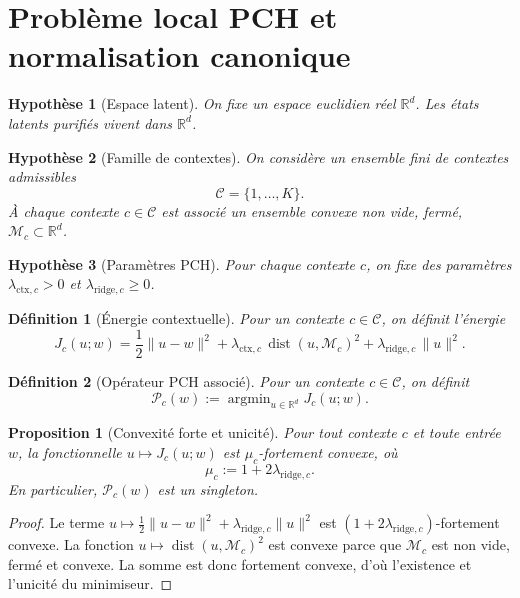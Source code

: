 \documentclass[11pt,a4paper]{article}
\newtheorem{definition}{Définition}[section]
\newtheorem{assumption}{Hypothèse}[section]
\newtheorem{proposition}{Proposition}[section]
\DeclareMathOperator{\argmin}{argmin}
\DeclareMathOperator{\dist}{dist}
\newcommand{\R}{\mathbb R}
\newcommand{\Mcal}{\mathcal M}
\newcommand{\Ccal}{\mathcal C}
\newcommand{\Pcal}{\mathcal P}
\begin{document}
\section{Problème local PCH et normalisation canonique}

\begin{assumption}[Espace latent]
On fixe un espace euclidien réel \(\R^d\). Les états latents purifiés vivent dans \(\R^d\).
\end{assumption}

\begin{assumption}[Famille de contextes]
On considère un ensemble fini de contextes admissibles
\[
\Ccal=\{1,\dots,K\}.
\]
À chaque contexte \(c\in\Ccal\) est associé un ensemble convexe non vide, fermé, \(\Mcal_c\subset\R^d\).
\end{assumption}

\begin{assumption}[Paramètres PCH]
Pour chaque contexte \(c\), on fixe des paramètres \(\lambda_{\mathrm{ctx},c}>0\) et \(\lambda_{\mathrm{ridge},c}\ge 0\).
\end{assumption}

\begin{definition}[Énergie contextuelle]
Pour un contexte \(c\in\Ccal\), on définit l'énergie
\[
J_c(u;w)=\frac12\|u-w\|^2+\lambda_{\mathrm{ctx},c}\,\dist(u,\Mcal_c)^2+\lambda_{\mathrm{ridge},c}\,\|u\|^2.
\]
\end{definition}

\begin{definition}[Opérateur PCH associé]
Pour un contexte \(c\in\Ccal\), on définit
\[
\Pcal_c(w):=\argmin_{u\in\R^d}J_c(u;w).
\]
\end{definition}

\begin{proposition}[Convexité forte et unicité]
Pour tout contexte \(c\) et toute entrée \(w\), la fonctionnelle \(u\mapsto J_c(u;w)\) est \(\mu_c\)-fortement convexe, où
\[
\mu_c:=1+2\lambda_{\mathrm{ridge},c}.
\]
En particulier, \(\Pcal_c(w)\) est un singleton.
\end{proposition}

\begin{proof}
Le terme \(u\mapsto \frac12\|u-w\|^2+\lambda_{\mathrm{ridge},c}\|u\|^2\) est \((1+2\lambda_{\mathrm{ridge},c})\)-fortement convexe. La fonction \(u\mapsto \dist(u,\Mcal_c)^2\) est convexe parce que \(\Mcal_c\) est non vide, fermé et convexe. La somme est donc fortement convexe, d'où l'existence et l'unicité du minimiseur.
\end{proof}
\end{document}
